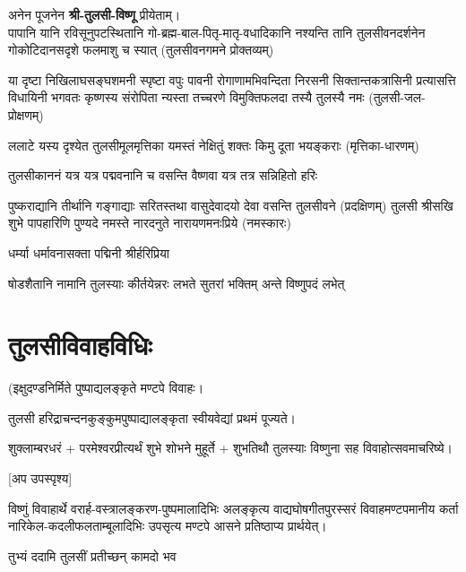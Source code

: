 \begin{center}
अनेन पूजनेन \textbf{श्री-तुलसी-विष्णू} प्रीयेताम्।\\

\fourlineindentedshloka
{पापानि यानि रविसूनुपटस्थितानि}
{गो-ब्रह्म-बाल-पितृ-मातृ-वधादिकानि}
{नश्यन्ति तानि तुलसीवनदर्शनेन}
{गोकोटिदानसदृशे फलमाशु च स्यात्}
{(तुलसीवनगमने प्रोक्तव्यम्)}

\fourlineindentedshloka
{या दृष्टा निखिलाघसङ्घशमनी स्पृष्टा वपुः पावनी}
{रोगाणामभिवन्दिता निरसनी सिक्तान्तकत्रासिनी}
{प्रत्यासत्ति विधायिनी भगवतः कृष्णस्य संरोपिता}
{न्यस्ता तच्चरणे विमुक्तिफलदा तस्यै तुलस्यै नमः}
(तुलसी-जल-प्रोक्षणम्)

\twolineshloka
{ललाटे यस्य दृश्येत तुलसीमूलमृत्तिका}
{यमस्तं नेक्षितुं शक्तः किमु दूता भयङ्कराः}
(मृत्तिका-धारणम्)

\twolineshloka
{तुलसीकाननं यत्र यत्र पद्मवनानि च}
{वसन्ति वैष्णवा यत्र तत्र सन्निहितो हरिः}

\twolineshloka
{पुष्कराद्यानि तीर्थानि गङ्गाद्याः सरितस्तथा}
{वासुदेवादयो देवा वसन्ति तुलसीवने}
(प्रदक्षिणम्)
\twolineshloka
{तुलसी श्रीसखि शुभे पापहारिणि पुण्यदे}
{नमस्ते नारदनुते नारायणमनःप्रिये}
(नमस्कारः)


{धर्म्या धर्मावनासक्ता पद्मिनी श्रीर्हरिप्रिया}

{षोडशैतानि नामानि तुलस्याः कीर्तयेन्नरः}
{लभते सुतरां भक्तिम् अन्ते विष्णुपदं लभेत्}

\end{center}

\section{तुलसीविवाहविधिः}

(इक्षुदण्डनिर्मिते पुष्पाद्यलङ्कृते मण्टपे विवाहः।

तुलसी हरिद्राचन्दनकुङ्कुमपुष्पाद्यालङ्कृता स्वीयवेद्यां प्रथमं पूज्यते।

शुक्लाम्बरधरं + परमेश्वरप्रीत्यर्थं शुभे शोभने मुहूर्ते + शुभतिथौ तुलस्याः विष्णुना सह विवाहोत्सवमाचरिष्ये।

[अप उपस्पृश्य]

विष्णुं विवाहार्थे वरार्ह-वस्त्रालङ्करण-पुष्पमालादिभिः अलङ्कृत्य वाद्यघोषगीतपुरस्सरं विवाहमण्टपमानीय कर्ता नारिकेल-कदलीफलताम्बूलादिभिः उपसृत्य मण्टपे आसने प्रतिष्ठाप्य प्रार्थयेत्।

{तुभ्यं ददामि तुलसीं प्रतीच्छन् कामदो भव}

